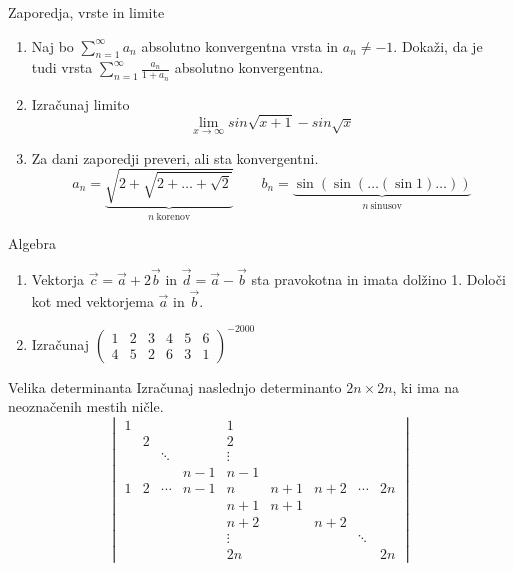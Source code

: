 \begin{frame}{Zaporedja, vrste in limite}
	\begin{enumerate}
		\item 
		Naj bo $\sum_{n=1}^{\infty} a_n$ absolutno konvergentna vrsta in $a_n \ne -1$.
		Dokaži, da je tudi vrsta $\sum_{n=1}^\infty \frac{a_n}{1+a_n}$
		absolutno konvergentna.

		\item
		Izračunaj limito
		$$\lim_{x\longrightarrow\infty}{sin\sqrt{x+1}-sin\sqrt{x}}$$

		\item
		Za dani zaporedji preveri, ali sta konvergentni.
		$$
		a_n = \underbrace{\sqrt{2+\sqrt{2+\dots+\sqrt{2}}}}_{n~\text{korenov}} \qquad 
		b_n = \underbrace{\sin(\sin(\dots(\sin 1)\dots))}_{n~\text{sinusov}}
		$$

	\end{enumerate}
\end{frame}

\begin{frame}{Algebra}
	\begin{enumerate}
		\item
		Vektorja $\vec{c}=\vec{a} + 2\vec{b}$ in $\vec{d}=\vec{a}-\vec{b}$
		sta pravokotna in imata dolžino 1. Določi kot med vektorjema $\vec{a}$ in $\vec{b}$.
		\item 
		Izračunaj
		$ \begin{pmatrix}
			1 & 2 & 3 & 4 & 5 & 6\\
			4 & 5 & 2 & 6 & 3 & 1
			\end{pmatrix}^{-2000} $
	\end{enumerate}
\end{frame}

\begin{frame}{Velika determinanta}
	Izračunaj naslednjo determinanto $2n \times 2n$, ki ima na neoznačenih mestih ničle.
	\[
\begin{vmatrix}
1	&  		&   	&		& 1 	&  		&  		& 		& 		 \\
 	& 2 	&  		&		& 2 	&  		& 		& 		& 		 \\
 	&  		& \ddots&		& \vdots&  		&  		& 		& 		 \\
 	& 		&    	&n-1	& n-1 	&  		& 		& 		& 		 \\
1	& 2 	& \cdots&n-1	& n 	& n+1 	& n+2	&\cdots &2n 	 \\
 	&		& 		&		& n+1 	& n+1 	& 	 	& 	 	& 	 	 \\
	& 		& 		&		& n+2	& 		& n+2	& 		& 		 \\
 	& 	 	& 		&		& \vdots&   	& 		& \ddots&  		\\
	&		&		&		&2n		&		&		&		&2n
\end{vmatrix}
\]
\end{frame}

